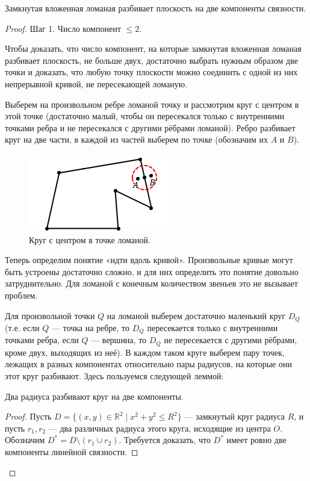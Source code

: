 \begin{theorem}
    Замкнутая вложенная ломаная разбивает плоскость на две компоненты связности. %
\end{theorem}
\begin{proof}
    Шаг 1. Число компонент $\leqslant 2$.

    Чтобы доказать, что число компонент, на которые замкнутая вложенная ломаная разбивает плоскость, не больше двух, достаточно выбрать нужным образом две точки и доказать, что любую точку плоскости можно соединить с одной из них непрерывной кривой, не пересекающей ломаную.

    Выберем на произвольном ребре ломаной точку и рассмотрим круг с центром в этой точке (достаточно малый, чтобы он пересекался только с внутренними точками ребра и не пересекался с другими рёбрами ломаной). Ребро разбивает круг на две части, в каждой из частей выберем по точке (обозначим их $A$ и $B$).

    \begin{figure}[h]
        \centering
        \includegraphics{images/c4.1.png}
        \caption{Круг с центром в точке ломаной.}
        \label{fig:c4.1}
    \end{figure}

    Теперь определим понятие «идти вдоль кривой». Произвольные кривые могут быть устроены достаточно сложно, и для них определить это понятие довольно затруднительно. Для ломаной с конечным количеством звеньев это не вызывает проблем.

    Для произвольной точки $Q$ на ломаной выберем достаточно маленький круг $D_Q$ (т.е. если $Q$ — точка на ребре, то $D_Q$ пересекается только с внутренними точками ребра, если $Q$ — вершина, то $D_Q$ не пересекается с другими рёбрами, кроме двух, выходящих из неё). В каждом таком круге выберем пару точек, лежащих в разных компонентах относительно пары радиусов, на которые они этот круг разбивают. Здесь пользуемся следующей леммой:

    \begin{lemma}
        Два радиуса разбивают круг на две компоненты.
    \end{lemma}
    \begin{proof}
        Пусть $D = \{ (x,y) \in \mathbb{R}^2 \mid x^2 + y^2 \leq R^2 \}$ — замкнутый круг радиуса $R$, и пусть $r_1, r_2$ — два различных радиуса этого круга, исходящие из центра $O$. Обозначим $D^* = D \setminus (r_1 \cup r_2)$. Требуется доказать, что $D^*$ имеет ровно две компоненты линейной связности.


\end{proof}
\end{proof}
